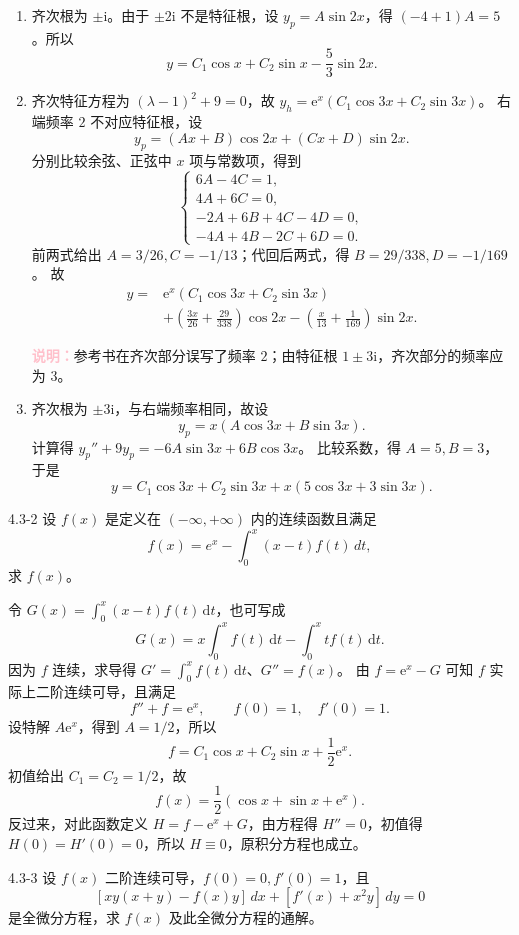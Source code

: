\documentclass[UTF8,a4paper,11pt]{ctexart}
\newcommand{\dd}{\,\mathrm d}
\newcommand{\e}{\mathrm e}
\newcommand{\note}[1]{\par\smallskip\noindent\textcolor{pink}{\bfseries 说明：}#1\par\smallskip}
\begin{document}
\begin{solution}
\begin{enumerate}[label=(\arabic*)]
\item 齐次根为 $\pm\mathrm i$。由于 $\pm2\mathrm i$ 不是特征根，设 $y_p=A\sin2x$，得 $(-4+1)A=5$。所以
\[
\boxed{y=C_1\cos x+C_2\sin x-\frac53\sin2x.}
\]

\item 齐次特征方程为 $(\lambda-1)^2+9=0$，故
$y_h=\e^x(C_1\cos3x+C_2\sin3x)$。
右端频率 $2$ 不对应特征根，设
\[
y_p=(Ax+B)\cos2x+(Cx+D)\sin2x.
\]
分别比较余弦、正弦中 $x$ 项与常数项，得到
\[
\begin{cases}
6A-4C=1,\\4A+6C=0,\\
-2A+6B+4C-4D=0,\\
-4A+4B-2C+6D=0.
\end{cases}
\]
前两式给出 $A=3/26,C=-1/13$；代回后两式，得 $B=29/338,D=-1/169$。
故
\[
\boxed{\begin{aligned}
y={}&\e^x(C_1\cos3x+C_2\sin3x)\\
&+\left(\frac{3x}{26}+\frac{29}{338}\right)\cos2x
-\left(\frac{x}{13}+\frac1{169}\right)\sin2x.
\end{aligned}}
\]
\note{参考书在齐次部分误写了频率 $2$；由特征根 $1\pm3\mathrm i$，齐次部分的频率应为 $3$。}

\item 齐次根为 $\pm3\mathrm i$，与右端频率相同，故设
\[
y_p=x(A\cos3x+B\sin3x).
\]
计算得 $y_p''+9y_p=-6A\sin3x+6B\cos3x$。
比较系数，得 $A=5,B=3$，于是
\[
\boxed{y=C_1\cos3x+C_2\sin3x+x(5\cos3x+3\sin3x).}
\]
\end{enumerate}
\end{solution}

\begin{problem}{4.3-2}
设 $f(x)$ 是定义在 $(-\infty,+\infty)$ 内的连续函数且满足
  \[
    f(x)=e^x-\int_0^x(x-t)f(t)\,dt,
  \]
  求 $f(x)$。
\end{problem}

\begin{solution}
令 $G(x)=\int_0^x(x-t)f(t)\dd t$，也可写成
\[
G(x)=x\int_0^xf(t)\dd t-\int_0^xtf(t)\dd t.
\]
因为 $f$ 连续，求导得 $G'=\int_0^xf(t)\dd t$、$G''=f(x)$。
由 $f=\e^x-G$ 可知 $f$ 实际上二阶连续可导，且满足
\[
f''+f=\e^x,\qquad f(0)=1,\quad f'(0)=1.
\]
设特解 $A\e^x$，得到 $A=1/2$，所以
\[
f=C_1\cos x+C_2\sin x+\frac12\e^x.
\]
初值给出 $C_1=C_2=1/2$，故
\[
\boxed{f(x)=\frac12(\cos x+\sin x+\e^x).}
\]
反过来，对此函数定义 $H=f-\e^x+G$，由方程得 $H''=0$，初值得 $H(0)=H'(0)=0$，所以 $H\equiv0$，原积分方程也成立。
\end{solution}

\begin{problem}{4.3-3}
设 $f(x)$ 二阶连续可导，$f(0)=0,f'(0)=1$，且
  \[
    [xy(x+y)-f(x)y]\,dx+[f'(x)+x^2y]\,dy=0
  \]
  是全微分方程，求 $f(x)$ 及此全微分方程的通解。
\end{problem}
\end{document}

